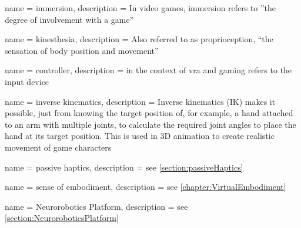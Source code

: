 













{
    name = immersion,
    description = {In video games, immersion refers to ''the degree of involvement with a game'' \autocite[p. ~2]{gameImmersion}}
}

{
    name = kinesthesia,
    description = {Also referred to as proprioception, \enquote{the sensation of body position and movement}\autocite{proprioception}}
}

{
    name = controller,
    description = {in the context of \gls{vra} and gaming refers to the input device}
}

{
    name = {inverse kinematics},
    description = {Inverse kinematics (IK) makes it possible, just from knowing the target position of, for example, a hand attached to an arm with multiple joints, to calculate the required joint angles to place the hand at its target position. This is used in 3D animation to create realistic movement of game characters \autocite[p. ~3f]{bodyTrackingVR}}
}

{
    name = {passive haptics},
    description = {see \autoref{section:passiveHaptics}}
}

{
    name = {sense of embodiment},
    description = {see \autoref{chapter:VirtualEmbodiment}}
}

{
    name = Neurorobotics Platform,
    description = {see \autoref{section:NeuroroboticsPlatform}}
}